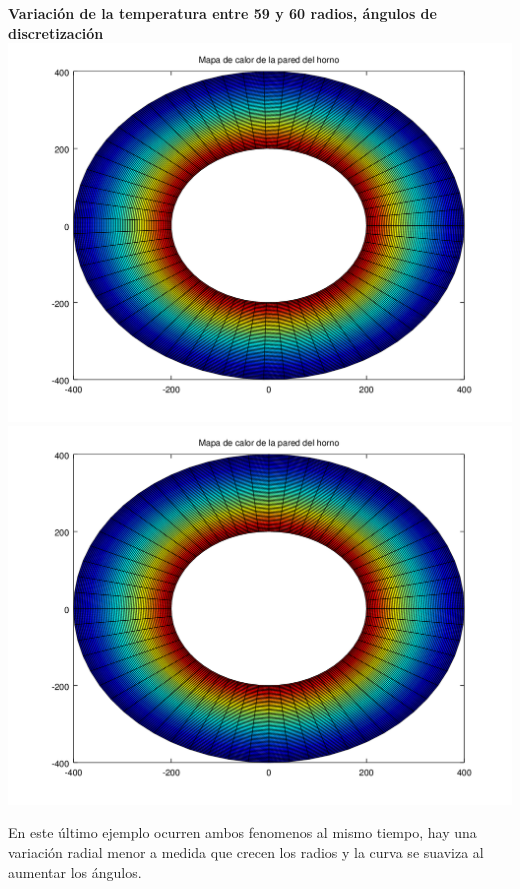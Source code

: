 \begin{enumerate}
		\textbf{Variación de la temperatura entre 59 y 60 radios, ángulos de discretización}\\
	  	\includegraphics[scale=0.35]{experimentos1a_1b/evolucion_posicion_isoterma_temperatura/variacion_radios_angulos_se_reduce_diferencia_radial/test11_testord_045_inst_001_heatmap.png}
		\includegraphics[scale=0.35]{experimentos1a_1b/evolucion_posicion_isoterma_temperatura/variacion_radios_angulos_se_reduce_diferencia_radial/test11_testord_046_inst_001_heatmap.png}

\vspace{0.5cm}

En este último ejemplo ocurren ambos fenomenos al mismo tiempo, hay una variación radial menor a medida que crecen los radios y la curva se suaviza al aumentar los ángulos.

\end{enumerate}

